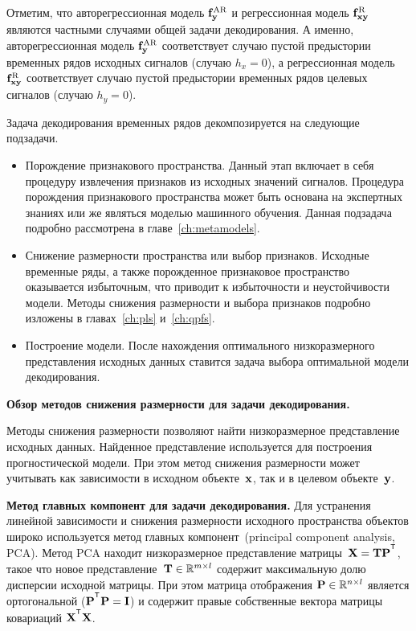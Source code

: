\documentclass[11pt, a5paper]{dissert}
\begin{document}
Отметим, что авторегрессионная модель $\mathbf{f}^{\text{AR}}_{\mathbf{y}}$ и регрессионная модель $\mathbf{f}^{\text{R}}_{\mathbf{x}\mathbf{y}}$ являются частными случаями общей задачи декодирования. А именно, авторегрессионная модель $\mathbf{f}^{\text{AR}}_{\mathbf{y}}$ соответствует случаю пустой предыстории временных рядов исходных сигналов (случаю $h_x = 0$), а регрессионная модель $\mathbf{f}^{\text{R}}_{\mathbf{x}\mathbf{y}}$ соответствует случаю пустой предыстории временных рядов целевых сигналов (случаю $h_y = 0$).

Задача декодирования временных рядов декомпозируется на следующие подзадачи.
\begin{itemize}
	\item Порождение признакового пространства. 
	Данный этап включает в себя процедуру извлечения признаков из исходных значений сигналов. 
	Процедура порождения признакового пространства может быть основана на экспертных знаниях или же являться моделью машинного обучения. 
	Данная подзадача подробно рассмотрена в главе~\ref{ch:metamodels}.
	
	\item Снижение размерности пространства или выбор признаков. 
	Исходные временные ряды, а также порожденное признаковое пространство оказывается избыточным, что приводит к избыточности и неустойчивости модели. 
	Методы снижения размерности и выбора признаков подробно изложены в главах~\ref{ch:pls} и~\ref{ch:qpfs}.
	
	\item Построение модели.
	После нахождения оптимального низкоразмерного представления исходных данных ставится задача выбора оптимальной модели декодирования.
\end{itemize}

\textbf{Обзор методов снижения размерности для задачи декодирования.}
\label{sec:ch1:dim_reduction}

Методы снижения размерности позволяют найти низкоразмерное представление исходных данных. 
Найденное представление используется для построения прогностической модели.
При этом метод снижения размерности может учитывать как зависимости в исходном объекте~$\mathbf{x}$, так и в целевом объекте~$\mathbf{y}$.

\vspace{0.5cm}
\textbf{Метод главных компонент для задачи декодирования.}
Для устранения линейной зависимости и снижения размерности исходного пространства объектов широко используется метод главных компонент~(principal component analysis, PCA). 
Метод PCA находит низкоразмерное представление матрицы~$\bX = \bT \bP^{\T}$, такое что новое представление~$\mathbf{T} \in \mathbb{R}^{m \times l}$ содержит максимальную долю дисперсии исходной матрицы.
При этом матрица отображения $\mathbf{P} \in \mathbb{R}^{n \times l}$ является ортогональной ($\bP^{\T} \bP = \bI$) и содержит правые собственные вектора матрицы ковариаций $\bX^{\T} \bX$.
\end{document}
